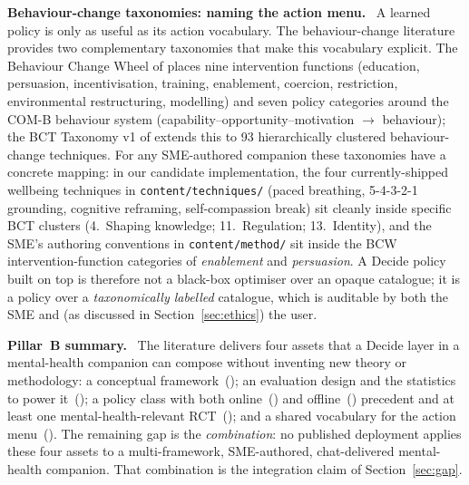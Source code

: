 \documentclass[10pt,conference]{article}
\newcommand{\secref}[1]{Section~\ref{#1}}
\renewcommand{\paragraph}[1]{\smallskip\par\noindent\textbf{#1}~\ignorespaces}
\begin{document}
\paragraph{Behaviour-change taxonomies: naming the action menu.}
A learned policy is only as useful as its action vocabulary. The
behaviour-change literature provides two complementary taxonomies that
make this vocabulary explicit. The Behaviour Change Wheel of
\cite{Michie2011BCW} places nine intervention functions (education,
persuasion, incentivisation, training, enablement, coercion,
restriction, environmental restructuring, modelling) and seven policy
categories around the COM-B behaviour system (capability--opportunity--motivation
$\to$ behaviour); the BCT Taxonomy v1 of \cite{Michie2013BCTTaxonomy}
extends this to 93 hierarchically clustered behaviour-change
techniques. For any SME-authored companion these taxonomies have a
concrete mapping: in our candidate implementation, the four
currently-shipped wellbeing techniques in \texttt{content/techniques/}
(paced breathing, 5-4-3-2-1 grounding, cognitive reframing,
self-compassion break) sit cleanly inside specific BCT clusters
(4.~Shaping knowledge; 11.~Regulation; 13.~Identity), and the SME's
authoring conventions in \texttt{content/method/} sit inside the BCW
intervention-function categories of \emph{enablement} and
\emph{persuasion}. A Decide policy built on top is therefore not a
black-box optimiser over an opaque catalogue; it is a policy over a
\emph{taxonomically labelled} catalogue, which is auditable by both
the SME and (as discussed in \secref{sec:ethics}) the user.

\paragraph{Pillar~B summary.}
The literature delivers four assets that a Decide layer in a
mental-health companion can compose without inventing new theory or
methodology: a conceptual
framework~(\cite{NahumShani2018JITAI}); an evaluation design and the
statistics to power it~(\cite{Klasnja2015MRT,Liao2016MRTSampleSize,Luers2018StandardizedEffect,Seewald2019MRTData});
a policy class with both online~(\cite{Liao2020PersonalizedHeartSteps})
and offline~(\cite{Ameko2020CMABEmotion}) precedent and at least one
mental-health-relevant RCT~(\cite{Aguilera2024DIAMANTERL}); and a
shared vocabulary for the action menu~(\cite{Michie2011BCW,Michie2013BCTTaxonomy}).
The remaining gap is the \emph{combination}: no published deployment
applies these four assets to a multi-framework, SME-authored,
chat-delivered mental-health companion. That combination is the
integration claim of \secref{sec:gap}.
\end{document}
